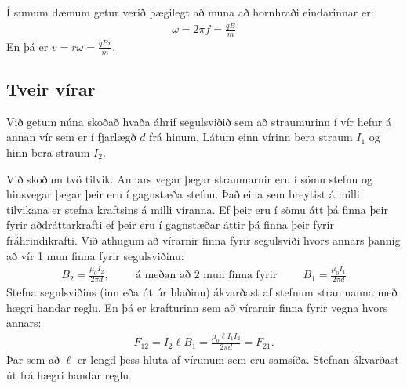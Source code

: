 \ifdefined \wholebook \else\documentclass[oneside]{book}\usepackage{EdlBook}\graphicspath{{figures/}}
\begin{document}
Í sumum dæmum getur verið þægilegt að muna að hornhraði eindarinnar er:
\begin{align*}
    \omega = 2\pi f = \frac{qB}{m}
\end{align*}
En þá er $v = r\omega = \frac{qBr}{m}$.

\newpage


\subsection*{Tveir vírar}

Við getum núna skoðað hvaða áhrif segulsviðið sem að straumurinn í vír hefur á annan vír sem er í fjarlægð $d$ frá hinum. Látum einn vírinn bera straum $I_1$ og hinn bera straum $I_2$.

\begin{figure}[H]
\hfill
{}
\hfill
{}
\hfill
\end{figure}

Við skoðum tvö tilvik. Annars vegar þegar straumarnir eru í sömu stefnu og hinsvegar þegar þeir eru í gagnstæða stefnu. Það eina sem breytist á milli tilvikana er stefna kraftsins á milli víranna. Ef þeir eru í sömu átt þá finna þeir fyrir aðdráttarkrafti ef þeir eru í gagnstæðar áttir þá finna þeir fyrir fráhrindikrafti. Við athugum að vírarnir finna fyrir segulsviði hvors annars þannig að vír 1 mun finna fyrir segulsviðinu:
\begin{align*}
    B_2 = \frac{\mu_0 I_2}{2 \pi d}, \hspace{1cm} \text{á meðan að $2$ mun finna fyrir} \hspace{1cm} B_1 = \frac{\mu_0 I_1}{2\pi d}
\end{align*}
Stefna segulsviðins (inn eða út úr blaðinu) ákvarðast af stefnum straumanna með hægri handar reglu. En þá er krafturinn sem að vírarnir finna fyrir vegna hvors annars:
\begin{align*}
    F_{12} = I_2 \ell B_1 = \frac{\mu_0 \ell I_1 I_2}{2 \pi d} = F_{21}.
\end{align*}
Þar sem að $\ell$ er lengd þess hluta af vírunum sem eru samsíða. Stefnan ákvarðast út frá hægri handar reglu.
\end{document}
